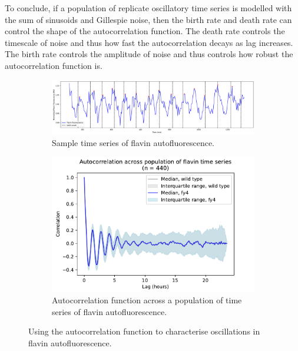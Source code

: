 To conclude, if a population of replicate oscillatory time series is modelled with the sum of sinusoids and Gillespie noise, then the birth rate and death rate can control the shape of the autocorrelation function.
The death rate controls the timescale of noise and thus how fast the autocorrelation decays as lag increases.
The birth rate controls the amplitude of noise and thus controls how robust the autocorrelation function is.


\begin{figure}
  \centering
  \begin{subfigure}[t]{0.7\textwidth}
  \centering
    \includegraphics[width=\linewidth]{26643_ts.png}
    \caption{
      Sample time series of flavin autofluorescence.
    }
    \label{fig:acf-sinusoid-biol-ts}
  \end{subfigure}

  \begin{subfigure}[t]{0.7\textwidth}
  \centering
    \includegraphics[width=\linewidth]{fy4_26643_plots_06.png}
    \caption{
      Autocorrelation function across a population of time series of flavin autofluorescence.
    }
    \label{fig:acf-sinusoid-biol-acf}
  \end{subfigure}

  \caption{
    Using the autocorrelation function to characterise oscillations in flavin autofluorescence.
  }
  \label{fig:acf-sinusoid-biol}
\end{figure}

